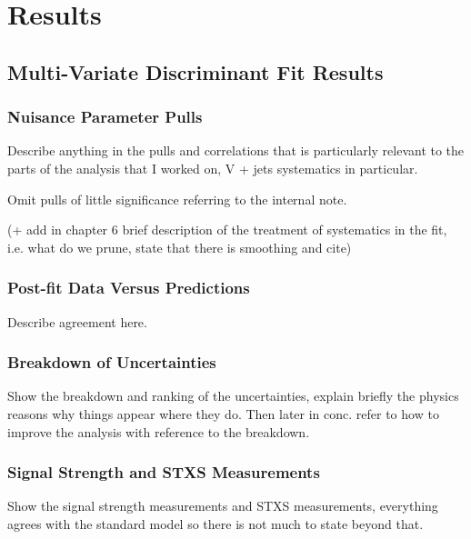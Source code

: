 \chapter{Results}%
\label{ch:results}
\section{\texorpdfstring{\VHbb}{VH->bb} Multi-Variate Discriminant Fit Results}%
\label{sec:mva-results}

\subsection{Nuisance Parameter Pulls}
Describe anything in the pulls and correlations that is particularly relevant to
the parts of the analysis that I worked on, V + jets systematics in particular.

Omit pulls of little significance referring to the internal note.

(+ add in chapter 6 brief description of the treatment of systematics in the
fit, i.e. what do we prune, state that there is smoothing and cite)


\clearpage
\newpage

\subsection{Post-fit Data Versus Predictions}
Describe agreement here.







\clearpage
\newpage

\subsection{Breakdown of Uncertainties}
Show the breakdown and ranking of the uncertainties, explain briefly the physics
reasons why things appear where they do. Then later in conc. refer to how to
improve the analysis with reference to the breakdown.


\clearpage
\newpage

\subsection{Signal Strength and STXS Measurements}
Show the signal strength measurements and STXS measurements, everything agrees
with the standard model so there is not much to state beyond that.

